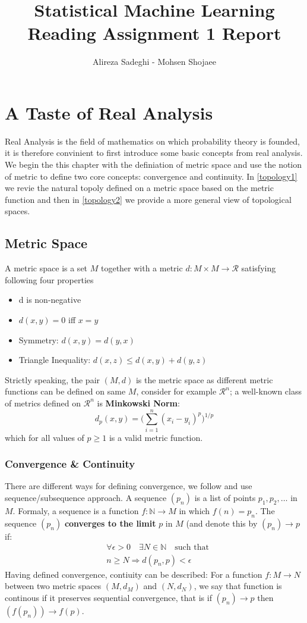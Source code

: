 \documentclass{article}
\title{Statistical Machine Learning \\ Reading Assignment 1 Report}
\author{Alireza Sadeghi - Mohsen Shojaee}
\begin{document}
\maketitle
    
\section{A Taste of Real Analysis}
Real Analysis is the field of mathematics on which probability theory is founded, it is therefore convinient to first introduce some basic concepts from real analysis. We begin the this chapter with the definiation of metric space and use the notion of metric to define two core concepts: convergence and continuity. In  \ref{topology1} we revie the natural topoly defined on a metric space based on the metric function and then in \ref{topology2} we provide a more general view of topological spaces. 
\subsection{Metric Space}
A metric space is a set $M$ together with a metric $d: M \times M \to \mathcal{R}$ satisfying following four properties
\begin{itemize}
\item d is non-negative
\item $d(x,y)=0$ iff $x=y$
\item Symmetry: $d(x,y) = d(y,x)$
\item Triangle Inequality: $d(x,z) \leq d(x,y) + d(y,z) $
\end{itemize}

Strictly speaking, the pair $(M,d)$ is the metric space as different metric functions can be defined on same $M$, consider for example $\mathcal{R}^n$; a well-known class of metrics defined on $\mathcal{R}^n$ is \textbf{Minkowski Norm}:
\[
d_p(x,y) = \big ( \sum_{i=1}^n (x_i - y_i)^p \big )^{1/p}
\]
which for all values of $p \geq 1$ is a valid metric function.

\subsubsection{Convergence \& Continuity}
There are different ways for defining convergence, we follow \cite{pough} and use sequence/subsequence approach. A sequence $(p_n)$ is a list of points $p_1, p_2, \ldots$ in $M$. Formaly, a sequence is a function $f: \mathbb{N} \to M $ in which $f(n) = p_n$. The sequence $(p_n)$ {\bf converges to the limit} $p$ in $M$ (and denote this by $(p_n) \to p$ if:
\begin{align*}
& \forall \epsilon > 0 \quad \exists N \in \mathbb{N} \quad \text{such that} \\
& n \geq N \Rightarrow d(p_n, p) < \epsilon
\end{align*}
Having defined convergence, contiuity can be described: For a function $f: M \to N$ between two metric spaces $(M, d_M)$ and $(N, d_N)$, we say that function is continous if it preserves sequential convergence, that is if $(p_n) \to p$ then $(f(p_n)) \to f(p)$.
\end{document}
